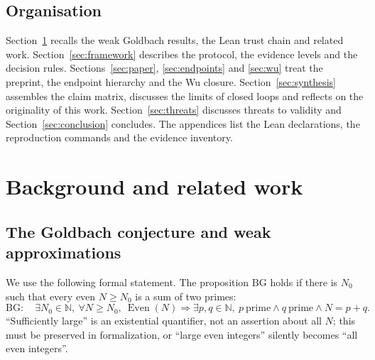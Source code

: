 \documentclass[11pt,a4paper]{article}
\theoremstyle{plain}
\theoremstyle{definition}
\newcommand{\BG}{\mathrm{BG}}
\newcommand{\Even}{\operatorname{Even}}
\newcommand{\N}{\mathbb{N}}
\begin{document}
\subsection{Organisation}
\label{sec:organization}

Section~\ref{sec:background} recalls the weak Goldbach results, the Lean trust chain and related work. Section~\ref{sec:framework} describes the protocol, the evidence levels and the decision rules. Sections~\ref{sec:paper}, \ref{sec:endpoints} and \ref{sec:wu} treat the preprint, the endpoint hierarchy and the Wu closure. Section~\ref{sec:synthesis} assembles the claim matrix, discusses the limits of closed loops and reflects on the originality of this work. Section~\ref{sec:threats} discusses threats to validity and Section~\ref{sec:conclusion} concludes. The appendices list the Lean declarations, the reproduction commands and the evidence inventory.

\section{Background and related work}
\label{sec:background}

\subsection{The Goldbach conjecture and weak approximations}
\label{sec:bg}

We use the following formal statement. The proposition $\BG$ holds if there is $N_0$ such that every even $N\ge N_0$ is a sum of two primes:
\begin{equation}
\BG:\quad \exists N_0\in\N,\ \forall N\ge N_0,\ \Even(N)\Longrightarrow
\exists p,q\in\N,\ p\ \text{prime}\land q\ \text{prime}\land N=p+q.
\label{eq:bg}
\end{equation}
``Sufficiently large'' is an existential quantifier, not an assertion about all $N$; this must be preserved in formalization, or ``large even integers'' silently becomes ``all even integers''.
\end{document}
